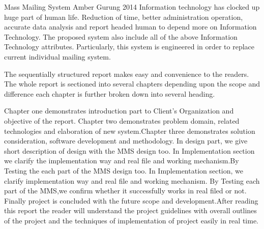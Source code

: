  \begin{conf-abstract}[]
{Mass Mailing System}
{
Amber Gurung
}
{2014}
Information technology has clocked up huge part of human life.
Reduction of time, better administration operation, accurate data analysis
and report headed human to depend more on Information Technology.
The proposed system also include all of the above Information Technology
attributes. Particularly, this system is engineered in order to replace
current individual mailing system.

The sequentially structured report makes easy and convenience to the
readers. The whole report is sectioned into several chapters depending
upon the scope and difference each chapter is further broken down into 
several heading.

Chapter one demonstrates introduction part to Client's Organization and
objective of the report. Chapter two demonstrates problem domain,
related technologies and elaboration of new system.Chapter three
demonstrates solution consideration, software development and
methodology. In design part, we give short description of design
with the MMS design too. In Implementation section we clarify the
implementation way and real file and working mechanism.By Testing
the each part of the MMS design too. In Implementation section, we clarify 
implementation way and real file and working mechanism. By Testing 
each part of the MMS,we confirm whether it successfully works in
real filed or not. Finally project is concluded with the future scope and 
development.After reading this report the reader will understand the
project guidelines with overall outlines of the project and the techniques
of implementation of project easily in real time.
  \end{conf-abstract}